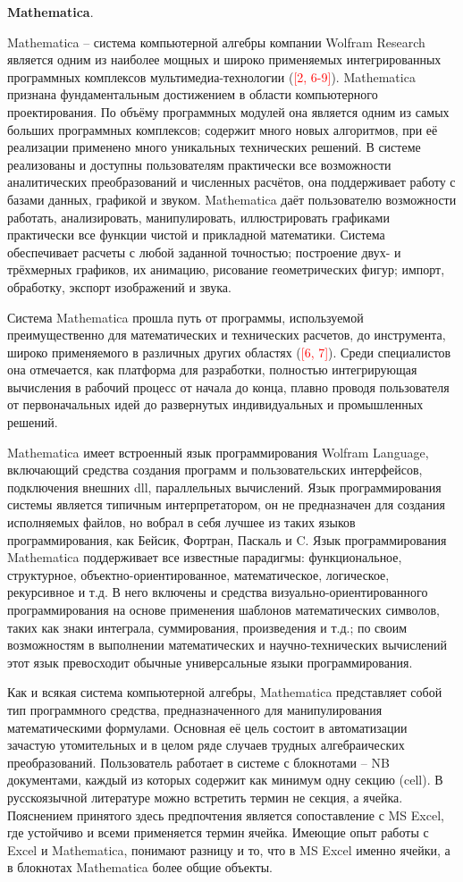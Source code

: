 \textbf{Mathematica}.

Mathematica -- система компьютерной алгебры компании Wolfram Research является одним из наиболее мощных и широко применяемых интегрированных программных комплексов мультимедиа-технологии (\textcolor{red}{[2, 6-9]}). Mathematica признана фундаментальным достижением в области компьютерного проектирования. По объёму программных модулей она является одним из самых больших программных комплексов; содержит много новых алгоритмов, при её реализации применено много уникальных технических решений. В системе реализованы и доступны пользователям практически все возможности аналитических преобразований и численных расчётов, она поддерживает работу с базами данных, графикой и звуком. Mathematica даёт пользователю возможности работать, анализировать, манипулировать, иллюстрировать графиками практически все функции чистой и прикладной математики. Система обеспечивает расчеты с любой заданной точностью; построение двух- и трёхмерных графиков, их анимацию, рисование геометрических фигур; импорт, обработку, экспорт изображений и звука.

Система Mathematica прошла путь от программы, используемой преимущественно для математических и технических расчетов, до инструмента, широко применяемого в различных других областях (\textcolor{red}{[6, 7]}). Среди специалистов она отмечается, как платформа для разработки, полностью интегрирующая вычисления в рабочий процесс от начала до конца, плавно проводя пользователя от первоначальных идей до развернутых индивидуальных и промышленных решений.

Mathematica имеет встроенный язык программирования Wolfram Language, включающий средства создания программ и пользовательских интерфейсов, подключения внешних dll, параллельных вычислений. Язык программирования системы является типичным интерпретатором, он не предназначен для создания исполняемых файлов, но вобрал в себя лучшее из таких языков программирования, как Бейсик, Фортран, Паскаль и C. Язык программирования Mathematica поддерживает все известные парадигмы: функциональное, структурное, объектно-ориентированное, математическое, логическое, рекурсивное и т.д. В него включены и средства визуально-ориентированного программирования на основе применения шаблонов математических символов, таких как знаки интеграла, суммирования, произведения и т.д.; по своим возможностям в выполнении математических и научно-технических вычислений этот язык превосходит обычные универсальные языки программирования.

Как и всякая система компьютерной алгебры, Mathematica представляет собой тип программного средства, предназначенного для манипулирования математическими формулами. Основная её цель состоит в автоматизации зачастую утомительных и в целом ряде случаев трудных алгебраических преобразований. Пользователь работает в системе с блокнотами -- NB документами, каждый из которых содержит как минимум одну секцию (cell). В русскоязычной литературе можно встретить термин не секция, а ячейка. Пояснением принятого здесь предпочтения является сопоставление с MS Excel, где устойчиво и всеми применяется термин ячейка. Имеющие опыт работы с Excel и Mathematica, понимают разницу и то, что в MS Excel именно ячейки, а в блокнотах Mathematica более общие объекты. 

